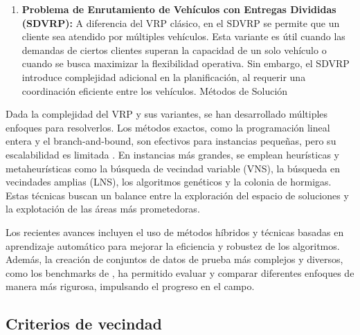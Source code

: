 \documentclass{article}
\begin{document}
\begin{enumerate}
\item
\textbf{Problema de Enrutamiento de Vehículos con Entregas Divididas (SDVRP):}
A diferencia del VRP clásico, en el SDVRP se permite que un cliente sea atendido por múltiples vehículos. Esta variante es útil cuando las demandas de ciertos clientes superan la capacidad de un solo vehículo o cuando se busca maximizar la flexibilidad operativa. Sin embargo, el SDVRP introduce complejidad adicional en la planificación, al requerir una coordinación eficiente entre los vehículos.
Métodos de Solución
\end{enumerate}

Dada la complejidad del VRP y sus variantes, se han desarrollado múltiples enfoques para resolverlos. Los métodos exactos, como la programación lineal entera y el branch-and-bound, son efectivos para instancias pequeñas, pero su escalabilidad es limitada \cite{ref5}. En instancias más grandes, se emplean heurísticas y metaheurísticas como la búsqueda de vecindad variable (VNS), la búsqueda en vecindades amplias (LNS)\cite{ref4}, los algoritmos genéticos y la colonia de hormigas.\cite{ref7} Estas técnicas buscan un balance entre la exploración del espacio de soluciones y la explotación de las áreas más prometedoras.

Los recientes avances incluyen el uso de métodos híbridos y técnicas basadas en aprendizaje automático para mejorar la eficiencia y robustez de los algoritmos. Además, la creación de conjuntos de datos de prueba más complejos y diversos, como los benchmarks de \cite{ref10}, ha permitido evaluar y comparar diferentes enfoques de manera más rigurosa, impulsando el progreso en el campo.

\subsection{Criterios de vecindad}
\end{document}

